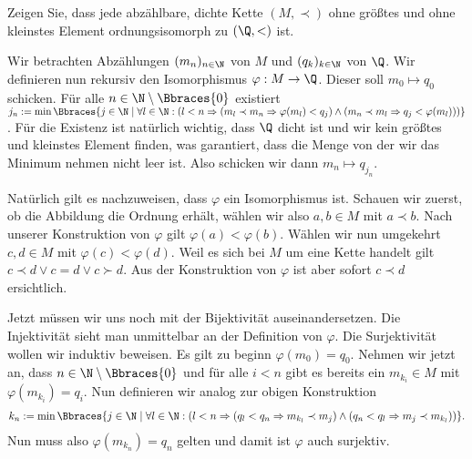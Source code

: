 \begin{exercise}
    Zeigen Sie, dass jede abzählbare, dichte Kette $(M, \prec)$ ohne größtes und ohne kleinstes Element ordnungsisomorph zu $(\Q, <)$ ist.
\end{exercise}
\begin{solution}
    Wir betrachten Abzählungen $(m_n)_{n \in \N}$ von $M$ und $(q_k)_{k \in \N}$ von $\Q$. Wir definieren nun rekursiv den Isomorphismus $\varphi: M \to \Q$. Dieser soll $m_0 \mapsto q_0$ schicken. Für alle $n \in \N \setminus \Bbraces{0}$ existiert $j_n := \min\Bbraces{j \in \N \mid \forall l \in \N: (l < n \Rightarrow (m_l \prec m_n \Rightarrow \varphi(m_l) < q_j) \land (m_n \prec m_l \Rightarrow q_j < \varphi(m_l) ) )}$. Für die Existenz ist natürlich wichtig, dass $\Q$ dicht ist und wir kein größtes und kleinstes Element finden, was garantiert, dass die Menge von der wir das Minimum nehmen nicht leer ist. Also schicken wir dann $m_n \mapsto q_{j_n}$.
    
    Natürlich gilt es nachzuweisen, dass $\varphi$ ein Isomorphismus ist. Schauen wir zuerst, ob die Abbildung die Ordnung erhält, wählen wir also $a,b \in M$ mit $a \prec b$. Nach unserer Konstruktion von $\varphi$ gilt $\varphi(a) < \varphi(b)$. Wählen wir nun umgekehrt $c,d \in M$ mit $\varphi(c) < \varphi(d)$. Weil es sich bei $M$ um eine Kette handelt gilt $c \prec d \lor c = d \lor c \succ d$. Aus der Konstruktion von $\varphi$ ist aber sofort $c \prec d$ ersichtlich. 

    Jetzt müssen wir uns noch mit der Bijektivität auseinandersetzen. Die Injektivität sieht man unmittelbar an der Definition von $\varphi$. Die Surjektivität wollen wir induktiv beweisen. Es gilt zu beginn $\varphi(m_0) = q_0$. Nehmen wir jetzt an, dass $n \in \N \setminus \Bbraces{0}$ und für alle $i < n$ gibt es bereits ein $m_{k_i} \in M$ mit $\varphi(m_{k_i}) = q_i$. Nun definieren wir analog zur obigen Konstruktion
    \begin{align*}
        k_n :=  \min\Bbraces{j \in \N \mid \forall l \in \N: (l < n \Rightarrow (q_l < q_n \Rightarrow m_{k_l} \prec m_j) \land (q_n < q_l \Rightarrow m_j \prec m_{k_l} ) )} .
    \end{align*}
    Nun muss also $\varphi(m_{k_n}) = q_n$ gelten und damit ist $\varphi$ auch surjektiv.
\end{solution}
